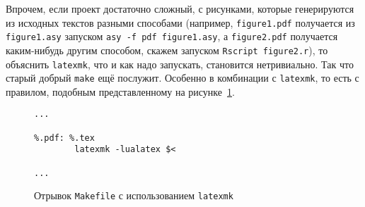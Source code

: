 \documentclass[a4paper,12pt]{article}
\newcommand\exe[1]{\texttt{#1}}
\newcommand\file[1]{\texttt{#1}}
\begin{document}
Впрочем, если проект достаточно сложный, с рисунками, которые генерируются
из исходных текстов разными способами (например, \file{figure1.pdf}
получается из \file{figure1.asy} запуском \verb|asy -f pdf figure1.asy|,
а \file{figure2.pdf} получается каким-нибудь другим способом, скажем
запуском \verb|Rscript figure2.r|), то объяснить \exe{latexmk}, что и как
надо запускать, становится нетривиально. Так что старый добрый \exe{make}
ещё послужит. Особенно в комбинации с \exe{latexmk}, то есть с правилом,
подобным представленному на рисунке~\ref{latexmk3}.
\begin{figure}[tp]
\begin{tcolorbox}
\footnotesize
\begin{verbatim}
...

%.pdf: %.tex
        latexmk -lualatex $<

...
\end{verbatim}
\end{tcolorbox}
\caption{Отрывок \file{Makefile} с использованием
\exe{latexmk}}\label{latexmk3}
\end{figure}
\end{document}
